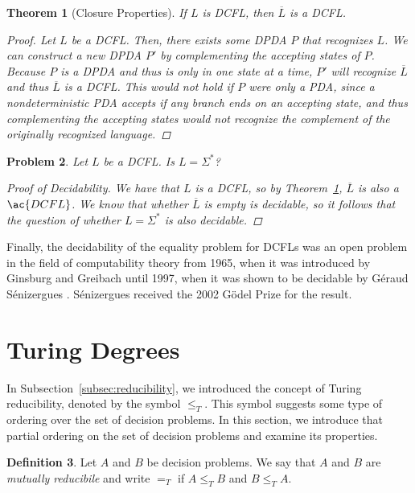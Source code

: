 \documentclass[psamsfonts]{amsart}
\newtheorem{thm}{Theorem}[section]
\newtheorem{prob}[thm]{Problem}
\theoremstyle{definition}
\newtheorem{defn}[thm]{Definition}
\theoremstyle{remark}
\numberwithin{equation}{section}
\begin{document}
\begin{thm}[Closure Properties]
  \label{dcfl:complement}
  If $L$ is \ac{DCFL}, then $\overline{L}$ is a
  \ac{DCFL}.
  \begin{proof}
    Let $L$ be a \ac{DCFL}. Then, there exists some \ac{DPDA} $P$ that
    recognizes $L$. We can construct a new \ac{DPDA} $P'$ by complementing the
    accepting states of $P$. Because $P$ is a \ac{DPDA} and thus is only in one
    state at a time, $P'$ will recognize $\overline{L}$ and thus $\overline{L}$
    is a \ac{DCFL}. This would not hold if $P$ were only a \ac{PDA}, since a
    nondeterministic \ac{PDA} accepts if \emph{any} branch ends on an accepting
    state, and thus complementing the accepting states would not recognize the
    complement of the originally recognized language.
\end{proof}
\end{thm}

\begin{prob}
  Let $L$ be a \ac{DCFL}. Is $L = \Sigma^*$?
  \begin{proof}[Proof of Decidability]
    We have that $L$ is a \ac{DCFL}, so by Theorem~\ref{dcfl:complement},
    $\overline{L}$ is also a $\ac{DCFL}$.
    We know that whether $\overline{L}$ is empty is decidable, so it follows
    that the question of whether $L = \Sigma^*$ is also decidable.
  \end{proof}
\end{prob}

Finally, the decidability of the equality problem for \acp{DCFL} was an open problem in the field of
computability theory from 1965, when it was introduced by Ginsburg and Greibach
until 1997, when it was shown to be decidable by G\'eraud S\'enizergues
\cite{ginsburg65:_deter,senizergues_det_pd_decid}. S\'enizergues received the 2002 G\"odel Prize
for the result.

\section{Turing Degrees}
In Subsection~\ref{subsec:reducibility}, we introduced the concept of
Turing reducibility, denoted by the symbol $\leq_T$. This symbol suggests some type of
ordering over the set of decision problems. In this section, we introduce that
partial ordering on the set of decision problems and examine its properties.

\begin{defn}
  Let $A$ and $B$ be decision problems. We say that $A$ and $B$ are
  \emph{mutually reducibile} and write $=_T$ if $A \leq_T B$ and $B \leq_T A$.
\end{defn}
\end{document}
